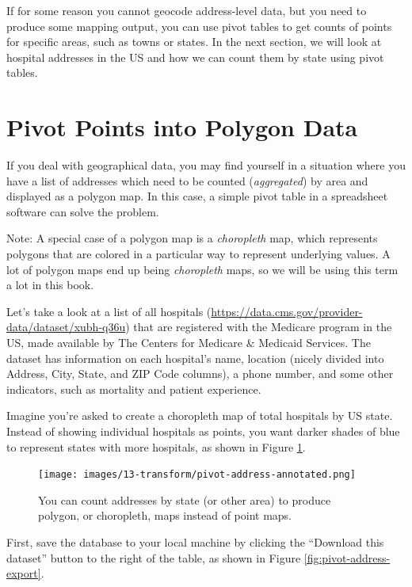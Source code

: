 \documentclass[
  english,
]{book}
\begin{document}
If for some reason you cannot geocode address-level data, but you need to produce some mapping output,
you can use pivot tables to get counts of points for specific areas, such as towns or states. In the next section,
we will look at hospital addresses in the US and how we can count them by state using pivot tables.

\hypertarget{pivot-point-to-polygon}{%
\section*{Pivot Points into Polygon Data}\label{pivot-point-to-polygon}}

If you deal with geographical data, you may find yourself in a situation where
you have a list of addresses which need to be counted (\emph{aggregated}) by area
and displayed as a polygon map. In this case, a simple pivot table in a spreadsheet
software can solve the problem.

Note: A special case of a polygon map is a \emph{choropleth} map,
which represents polygons that are colored in a particular way to represent underlying values.
A lot of polygon maps end up being \emph{choropleth} maps, so we will be using this term a lot in this book.

Let's take a look at a list of all hospitals (\url{https://data.cms.gov/provider-data/dataset/xubh-q36u}) that are registered with the Medicare program in the US, made available by The Centers for Medicare \& Medicaid Services. The dataset has information on each hospital's name, location (nicely divided into Address, City, State, and ZIP Code columns), a phone number, and some other indicators, such as mortality and patient experience.

Imagine you're asked to create a choropleth map of total hospitals by US state.
Instead of showing individual hospitals as points, you want darker shades of blue to represent states with more hospitals, as shown in Figure \ref{fig:pivot-address}.



\begin{figure}
\centering
\texttt{[image: images/13-transform/pivot-address-annotated.png]}
\caption{\label{fig:pivot-address}You can count addresses by state (or other area) to produce polygon, or choropleth, maps instead of point maps.}
\end{figure}

First, save the database to your local machine by clicking the ``Download this dataset'' button to the right of the table, as shown in Figure \ref{fig:pivot-address-export}.
\end{document}

